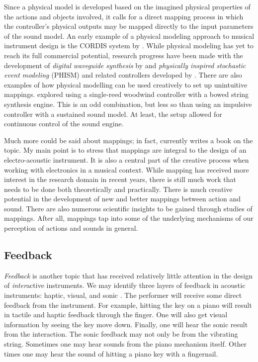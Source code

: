 Since a physical model is developed based on the imagined physical properties of the actions and objects involved, it calls for a direct mapping process in which the controller's physical outputs may be mapped directly to the input parameters of the sound model. An early example of a physical modeling approach to musical instrument design is the CORDIS system by \citet{cadoz_responsive_1984}. While physical modeling has yet to reach its full commercial potential, research progress have been made with the development of \emph{digital waveguide synthesis} by \citet{smith_physical_1992} and \emph{physically inspired stochastic event modeling} (PHISM) and related controllers developed by \citet{cook_principles_2001}. There are also examples of how physical modelling can be used creatively to set up unintuitive mappings. \citet{li_study_2020} explored using a single-reed woodwind controller with a bowed string synthesis engine. This is an odd combination, but less so than using an impulsive controller with a sustained sound model. At least, the setup allowed for continuous control of the sound engine.

Much more could be said about mappings; in fact, \citet{baalman_just_2021} currently writes a book on the topic. My main point is to stress that mappings are integral to the design of an electro-acoustic instrument. It is also a central part of the creative process when working with electronics in a musical context. While mapping has received more interest in the research domain in recent years, there is still much work that needs to be done both theoretically and practically. There is much creative potential in the development of new and better mappings between action and sound. There are also numerous scientific insights to be gained through studies of mappings. After all, mappings tap into some of the underlying mechanisms of our perception of actions and sounds in general.


\subsection{Feedback}

\emph{Feedback} is another topic that has received relatively little attention in the design of \emph{inter}active instruments.
We may identify three layers of feedback in acoustic instruments: haptic, visual, and sonic \citep{kvifte_towards_2006}. The performer will receive some direct feedback from the instrument. For example, hitting the key on a piano will result in tactile and haptic feedback through the finger. One will also get visual information by seeing the key move down. Finally, one will hear the sonic result from the interaction. The sonic feedback may not only be from the vibrating string. Sometimes one may hear sounds from the piano mechanism itself. Other times one may hear the sound of hitting a piano key with a fingernail.

